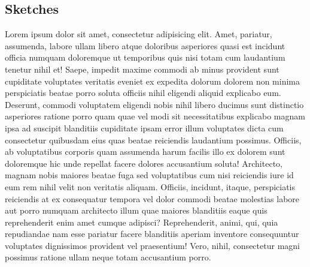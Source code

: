 \documentclass[a4paper,12pt]{report}
\begin{document}
\subsection{Sketches}
Lorem ipsum dolor sit amet, consectetur adipisicing elit. Amet, pariatur, assumenda, labore ullam libero atque doloribus asperiores quasi est incidunt officia numquam doloremque ut temporibus quis nisi totam cum laudantium tenetur nihil et! Saepe, impedit maxime commodi ab minus provident sunt cupiditate voluptates veritatis eveniet ex expedita dolorum dolorem non minima perspiciatis beatae porro soluta officiis nihil eligendi aliquid explicabo eum. Deserunt, commodi voluptatem eligendi nobis nihil libero ducimus sunt distinctio asperiores ratione porro quam quae vel modi sit necessitatibus explicabo magnam ipsa ad suscipit blanditiis cupiditate ipsam error illum voluptates dicta cum consectetur quibusdam eius quas beatae reiciendis laudantium possimus. Officiis, ab voluptatibus corporis quam assumenda harum facilis illo ex dolorem sunt doloremque hic unde repellat facere dolores accusantium soluta! Architecto, magnam nobis maiores beatae fuga sed voluptatibus cum nisi reiciendis iure id eum rem nihil velit non veritatis aliquam. Officiis, incidunt, itaque, perspiciatis reiciendis at ex consequatur tempora vel dolor commodi beatae molestias labore aut porro numquam architecto illum quae maiores blanditiis eaque quis reprehenderit enim amet cumque adipisci? Reprehenderit, animi, qui, quia repudiandae nam esse pariatur facere blanditiis aperiam inventore consequuntur voluptates dignissimos provident vel praesentium! Vero, nihil, consectetur magni possimus ratione ullam neque totam accusantium porro.
\end{document}
